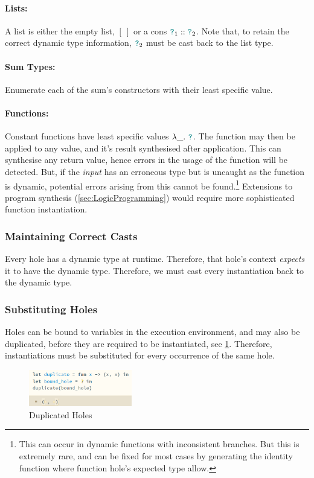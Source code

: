 \paragraph{Lists:} A list is either the empty list, $[\ ]$ or a cons ${\color{teal}\texttt{?}}_1 :: {\color{teal}\texttt{?}}_2$. Note that, to retain the correct dynamic type information, ${\color{teal}\texttt{?}}_2$ must be cast back to the list type. 
\paragraph{Sum Types:} Enumerate each of the sum's constructors with their least specific value.
\paragraph{Functions:} Constant functions have least specific values $\lambda \_.\ {\color{teal}\texttt{?}}$. The function may then be applied to any value, and it's result synthesised after application. This can synthesise any return value, hence errors in the usage of the function will be detected. But, if the \textit{input} has an erroneous type but is uncaught as the function is dynamic, potential errors arising from this cannot be found.\footnote{This can occur in dynamic functions with inconsistent branches. But this is extremely rare, and can be fixed for most cases by generating the identity function where function hole's expected type allow.} Extensions to program synthesis (\cref{sec:LogicProgramming}) would require more sophisticated function instantiation.


\subsubsection{Maintaining Correct Casts}
Every hole has a dynamic type at runtime. Therefore, that hole's context \textit{expects} it to have the dynamic type. Therefore, we must cast every instantiation back to the dynamic type.

\subsubsection{Substituting Holes}\label{sec:HoleSubstitutionImplementation}
Holes can be bound to variables in the execution environment, and may also be duplicated, before they are required to be instantiated, see \cref{fig:HoleDuplication}. Therefore, instantiations must be substituted for every occurrence of the same hole.

\begin{figure}[h]
\centering
\includegraphics[width=0.4\textwidth]{Media/Figures/duplicate_hole}
\caption{Duplicated Holes}
\label{fig:HoleDuplication}
\end{figure}

